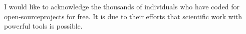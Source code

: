 

\begin{acknowledgements}      %

I would like to acknowledge the thousands of individuals who have coded for open-sourceprojects for free. It is due to their efforts that scientific work with powerful tools is possible.

\end{acknowledgements}



